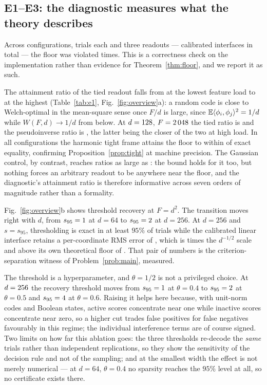 \subsection{E1--E3: the diagnostic measures what the theory describes}
\label{sec:res-e1}

Across \EoneConfigs{} configurations, \EoneTrials{} trials each and three readouts ---
\EoneMeasurements{} calibrated interfaces in total --- the floor was violated
\EoneViolations{} times. This is a correctness check on the implementation rather than
evidence for Theorem~\ref{thm:floor}, and we report it as such.

The attainment ratio of the tied readout falls from \EoneTiedRatioMax{} at the lowest feature
load to \EoneTiedRatioMin{} at the highest (Table~\ref{tab:e1}, Fig.~\ref{fig:overview}a): a
random code is close to Welch-optimal in the mean-square sense once $F/d$ is large, since
$\mathbb{E}\langle\phi_i,\phi_j\rangle^2=1/d$ while $W(F,d)\to1/d$ from below. At $d=128$,
$F=2\,048$ the tied ratio is \EoneTopTiedRatio{} and the pseudoinverse ratio is
\EoneTopPinvRatio, the latter being the closer of the two at high load. In all
\EoneTightFrameConfigs{} configurations the harmonic tight frame attains the floor to within
\EoneTightFrameDev{} of exact equality, confirming Proposition~\ref{prop:tight} at machine
precision. The Gaussian control, by contrast, reaches ratios as large as
\EoneGaussianRatioMax: the bound holds for it too, but nothing forces an arbitrary readout to
be anywhere near the floor, and the diagnostic's attainment ratio is therefore informative
across seven orders of magnitude rather than a formality.

Fig.~\ref{fig:overview}b shows threshold recovery at $F=d^2$. The transition moves right with
$d$, from $s_{95}=1$ at $d=64$ to $s_{95}=2$ at $d=256$. At
$d=256$ and $s=s_{95}$, thresholding is exact in at least $95\%$ of trials while the calibrated
linear interface retains a per-coordinate RMS error of \EtwoTwoFiveSixLinRms, which is
\EtwoTwoFiveSixLinRmsOverRoot{} times the $d^{-1/2}$ scale and above its own theoretical floor
of \EtwoTwoFiveSixLinRmsFloor. That pair of numbers is the criterion-separation witness of
Problem~\ref{prob:main}, measured.

The threshold is a hyperparameter, and $\theta=1/2$ is not a privileged choice. At
$d=256$ the recovery threshold moves from $s_{95}=1$ at
$\theta=0.4$ to $s_{95}=2$ at $\theta=0.5$ and
$s_{95}=4$ at $\theta=0.6$. Raising it helps here because, with unit-norm codes and Boolean
states, active scores concentrate near one while inactive scores concentrate near zero, so a
higher cut trades false positives for false negatives favourably in this regime; the individual
interference terms are of course signed. Two limits on how far this ablation goes: the three thresholds re-decode
the \emph{same} trials rather than independent replications, so they show the sensitivity of the
decision rule and not of the sampling; and at the smallest width the effect is not merely
numerical --- at $d=64$, $\theta=0.4$ no sparsity reaches the $95\%$ level at all, so no
certificate exists there.

